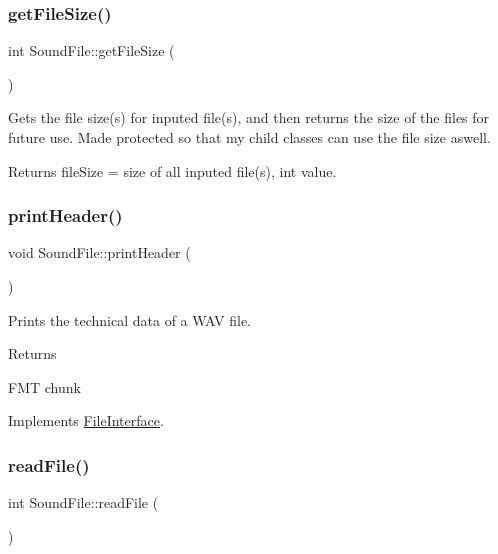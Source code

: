 \subsubsection{\texorpdfstring{get\+File\+Size()}{getFileSize()}}
{\footnotesize\ttfamily int Sound\+File\+::get\+File\+Size (\begin{DoxyParamCaption}{ }\end{DoxyParamCaption})\hspace{0.3cm}{\ttfamily [protected]}}

Gets the file size(s) for inputed file(s), and then returns the size of the files for future use. Made protected so that my child classes can use the file size aswell. \begin{DoxyReturn}{Returns}
file\+Size = size of all inputed file(s), int value. 
\end{DoxyReturn}
\mbox{\label{classSoundFile_a44b17fb295a9918410c7ec4242370ef9}} 
\subsubsection{\texorpdfstring{print\+Header()}{printHeader()}}
{\footnotesize\ttfamily void Sound\+File\+::print\+Header (\begin{DoxyParamCaption}{ }\end{DoxyParamCaption})\hspace{0.3cm}{\ttfamily [virtual]}}

Prints the technical data of a W\+AV file. \begin{DoxyReturn}{Returns}

\end{DoxyReturn}
F\+MT chunk 

Implements \hyperlink{classFileInterface_acfd092493ecf4f466d57721fbfdd8b23}{File\+Interface}.

\mbox{\label{classSoundFile_a35eb7dfeadb241c8ab4477ff1370dd5b}} 
\subsubsection{\texorpdfstring{read\+File()}{readFile()}}
{\footnotesize\ttfamily int Sound\+File\+::read\+File (\begin{DoxyParamCaption}{ }\end{DoxyParamCaption})\hspace{0.3cm}{\ttfamily [virtual]}}

